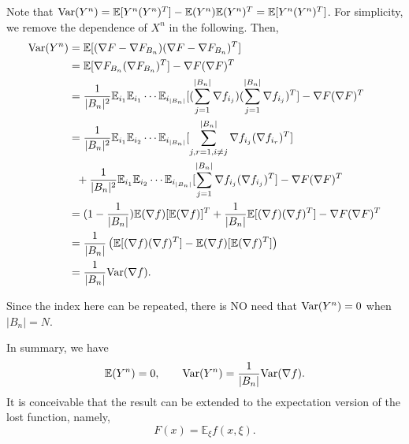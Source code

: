 Note that ${\rm Var}(Y^n) = \mathbb{E}[Y^n (Y^n)^T] - \mathbb{E}(Y^n)
\mathbb{E}(Y^n)^T = \mathbb{E}[Y^n (Y^n)^T]$. For simplicity,
we remove the dependence of $X^n$ in the following. Then, 
$$ 
\begin{aligned}
{\rm Var}(Y^n) &= \mathbb{E}[ (\nabla F - \nabla F_{B_n})
(\nabla F - \nabla F_{B_n})^T ]
\\
&= \mathbb{E}[\nabla F_{B_n} (\nabla F_{B_n})^T ] - \nabla F (\nabla
    F)^T \\
&= \frac{1}{|B_n|^2} \mathbb{E}_{i_1} \mathbb{E}_{i_1} \cdots
\mathbb{E}_{i_{|B_n|}}[ (\sum_{j=1}^{|B_n|} \nabla f_{i_j})
  (\sum_{j=1}^{|B_n|} \nabla f_{i_j})^T ] - \nabla F (\nabla F)^T \\
&= \frac{1}{|B_n|^2} \mathbb{E}_{i_1} \mathbb{E}_{i_2} \cdots
\mathbb{E}_{i_{|B_n|}}[ \sum_{j,r=1 , i\neq j}^{|B_n|} \nabla f_{i_j}
(\nabla f_{i_r})^T] \\ 
& ~~ + \frac{1}{|B_n|^2} \mathbb{E}_{i_1} \mathbb{E}_{i_2} \cdots
\mathbb{E}_{i_{|B_n|}} [\sum_{j=1}^{|B_n|} \nabla
f_{i_j} (\nabla f_{i_j})^T]- \nabla F (\nabla F)^T \\ 
& = (1 - \frac{1}{|B_n|}) \mathbb{E}(\nabla f) [\mathbb{E}(\nabla
    f)]^T + \frac{1}{|B_n|} \mathbb{E}[ (\nabla f) (\nabla f)^T] -
\nabla F (\nabla F)^T \\
&= \frac{1}{|B_n|} \left( \mathbb{E}[(\nabla f) (\nabla f)^T] -
    \mathbb{E}(\nabla f) [\mathbb{E}(\nabla f)^T] 
    \right) \\
&= \frac{1}{|B_n|} {\rm Var}(\nabla f).
\end{aligned}
$$ 

\begin{remark}
Since the index here can be repeated, there is NO need that ${\rm
Var}(Y^n) = 0$ when $|B_n| = N$.
\end{remark}

In summary, we have 
\begin{equation} \label{equ:summary}
\mathbb{E}(Y^n) = 0, \qquad {\rm Var}(Y^n) = \frac{1}{|B_n|} {\rm
  Var}(\nabla f).
\end{equation}
It is conceivable that the result can be extended to the expectation
version of the lost function, namely, 
$$ 
F(x) = \mathbb{E}_{\xi} f(x, \xi).
$$ 


